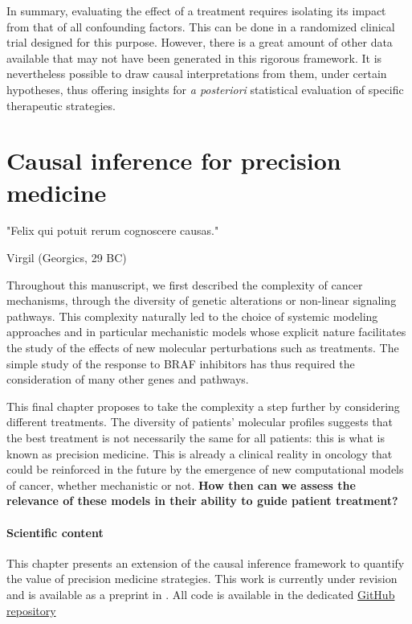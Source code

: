 \documentclass[a4paper,12pt,twoside,onecolumn,openright,final,oldfontcommands]{memoir}
\newcommand{\initial}[1]{
	\lettrine[lines=3,lhang=0.33,nindent=0em]{
		\color{gray}
     		{\textsc{#1}}}{}}
\let\BeginKnitrBlock\begin \let\EndKnitrBlock\end
\begin{document}
In summary, evaluating the effect of a treatment requires isolating its
impact from that of all confounding factors. This can be done in a
randomized clinical trial designed for this purpose. However, there is a
great amount of other data available that may not have been generated in
this rigorous framework. It is nevertheless possible to draw causal
interpretations from them, under certain hypotheses, thus offering
insights for \emph{a posteriori} statistical evaluation of specific
therapeutic strategies.

\chapter{Causal inference for precision
medicine}\label{chapter-precision}

\epigraph{"Felix qui potuit rerum cognoscere causas."}{Virgil (Georgics, 29 BC)}

\initial{T}hroughout this manuscript, we first described the complexity
of cancer mechanisms, through the diversity of genetic alterations or
non-linear signaling pathways. This complexity naturally led to the
choice of systemic modeling approaches and in particular mechanistic
models whose explicit nature facilitates the study of the effects of new
molecular perturbations such as treatments. The simple study of the
response to BRAF inhibitors has thus required the consideration of many
other genes and pathways.

This final chapter proposes to take the complexity a step further by
considering different treatments. The diversity of patients' molecular
profiles suggests that the best treatment is not necessarily the same
for all patients: this is what is known as precision medicine. This is
already a clinical reality in oncology that could be reinforced in the
future by the emergence of new computational models of cancer, whether
mechanistic or not. \textbf{How then can we assess the relevance of
these models in their ability to guide patient treatment?}

\BeginKnitrBlock{summarybox}
\subsubsection*{Scientific content}\label{scientific-content-6}

This chapter presents an extension of the causal inference framework to
quantify the value of precision medicine strategies. This work is
currently under revision and is available as a preprint in
\citet{beal2020causal}. All code is available in the dedicated
\href{https://github.com/JonasBeal/Causal_Precision_Medicine}{GitHub
repository}
\EndKnitrBlock{summarybox}
\end{document}
